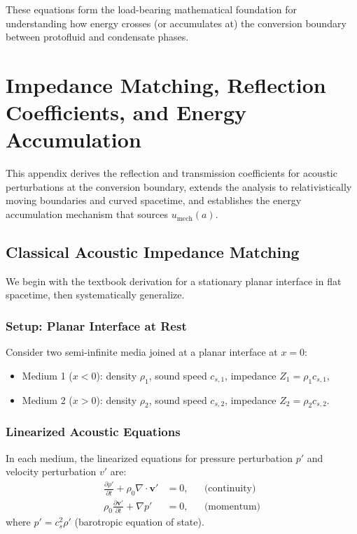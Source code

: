 These equations form the load-bearing mathematical foundation for understanding how energy crosses (or accumulates at) the conversion boundary between protofluid and condensate phases.



\section{Impedance Matching, Reflection Coefficients, and Energy Accumulation}
\label{app:impedance}

This appendix derives the reflection and transmission coefficients for acoustic perturbations at the conversion boundary, extends the analysis to relativistically moving boundaries and curved spacetime, and establishes the energy accumulation mechanism that sources $u_{\text{mech}}(a)$.

\subsection{Classical Acoustic Impedance Matching}
\label{app:classical_impedance}

We begin with the textbook derivation for a stationary planar interface in flat spacetime, then systematically generalize.

\subsubsection{Setup: Planar Interface at Rest}

Consider two semi-infinite media joined at a planar interface at $x = 0$:
\begin{itemize}
    \item Medium 1 ($x < 0$): density $\rho_1$, sound speed $c_{s,1}$, impedance $Z_1 = \rho_1 c_{s,1}$,
    \item Medium 2 ($x > 0$): density $\rho_2$, sound speed $c_{s,2}$, impedance $Z_2 = \rho_2 c_{s,2}$.
\end{itemize}

\subsubsection{Linearized Acoustic Equations}

In each medium, the linearized equations for pressure perturbation $p'$ and velocity perturbation $v'$ are:
\begin{align}
\label{eq:acoustic_eqs}
\frac{\partial \rho'}{\partial t} + \rho_0 \nabla \cdot \mathbf{v}' &= 0, && \text{(continuity)} \\
\rho_0 \frac{\partial \mathbf{v}'}{\partial t} + \nabla p' &= 0, && \text{(momentum)}
\end{align}
where $p' = c_s^2 \rho'$ (barotropic equation of state).

